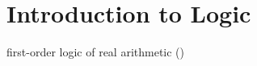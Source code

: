 \chapter{Introduction to Logic}
\label{sec:introduction-logic}

first-order logic of real arithmetic (\FOLR)
